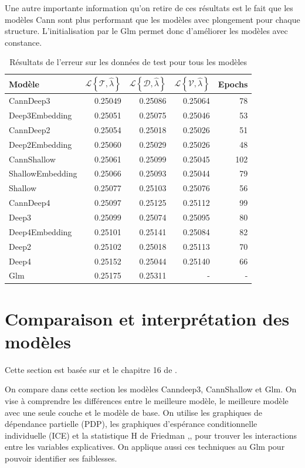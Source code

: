 Une autre importante information qu'on retire de ces résultats est le fait que les modèles Cann sont plus performant que les modèles avec plongement pour chaque structure. L'initialisation par le Glm permet donc d'améliorer  les modèles avec constance.   


\begin{table}
\centering
\caption{\label{tab:resultsTOT} Résultats de l'erreur sur les données de test pour tous les modèles}
\begin{tabular}{lrrrr}
\toprule
Modèle & $\mathcal{L}\left\{\mathcal{T},\hat{\lambda} \right\} $ & $\mathcal{L}\left\{\mathcal{D},\hat{\lambda} \right\} $ & $\mathcal{L}\left\{\mathcal{V},\hat{\lambda} \right\} $ & Epochs\\
\midrule
CannDeep3 & 0.25049 & 0.25086 & 0.25064 & 78\\
Deep3Embedding & 0.25051 & 0.25075 & 0.25046 & 53\\
CannDeep2 & 0.25054 & 0.25018 & 0.25026 & 51\\
Deep2Embedding & 0.25060 & 0.25029 & 0.25026 & 48\\
CannShallow & 0.25061 & 0.25099 & 0.25045 & 102\\
\addlinespace
ShallowEmbedding & 0.25066 & 0.25093 & 0.25044 & 79\\
Shallow & 0.25077 & 0.25103 & 0.25076 & 56\\
CannDeep4 & 0.25097 & 0.25125 & 0.25112 & 99\\
Deep3 & 0.25099 & 0.25074 & 0.25095 & 80\\
Deep4Embedding & 0.25101& 0.25141 & 0.25084 & 82\\
\addlinespace
Deep2 & 0.25102 & 0.25018 & 0.25113 & 70\\
Deep4 & 0.25152 & 0.25044 & 0.25140 & 66\\
Glm	  & 0.25175 & 0.25311 &    -    &  - \\
\bottomrule
\end{tabular}
\end{table}



\section{Comparaison et interprétation des modèles}
\label{sec:ComparaisonInterpretation}

Cette section est basée sur \citet{molnar2019} et le chapitre 16 de \citet{boehmke2019hands}.

On compare dans cette section les modèles Canndeep3, CannShallow et Glm. On vise à comprendre les différences entre le meilleure modèle, le meilleure modèle avec une seule couche et le modèle de base. On utilise les graphiques de dépendance partielle (PDP), les graphiques d'espérance conditionnelle individuelle (ICE) et la statistique H de Friedman ,\citet{friedman2008predictive}, pour trouver les interactions entre les variables explicatives. On applique aussi ces techniques au Glm pour pouvoir identifier ses faiblesses. 

